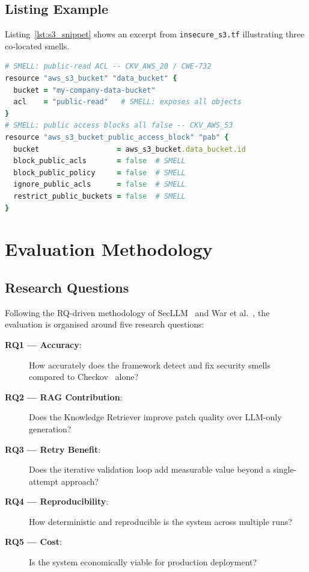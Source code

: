 \documentclass[12pt, a4paper]{report}
\begin{document}
\section{Listing Example}

Listing~\ref{lst:s3_snippet} shows an excerpt from \texttt{insecure\_s3.tf}
illustrating three co-located smells.

\begin{lstlisting}[language=Ruby,
  caption={Excerpt from \texttt{insecure\_s3.tf} showing three co-located security smells.},
  label={lst:s3_snippet}]
# SMELL: public-read ACL -- CKV_AWS_20 / CWE-732
resource "aws_s3_bucket" "data_bucket" {
  bucket = "my-company-data-bucket"
  acl    = "public-read"   # SMELL: exposes all objects
}
# SMELL: public access blocks all false -- CKV_AWS_53
resource "aws_s3_bucket_public_access_block" "pab" {
  bucket                  = aws_s3_bucket.data_bucket.id
  block_public_acls       = false  # SMELL
  block_public_policy     = false  # SMELL
  ignore_public_acls      = false  # SMELL
  restrict_public_buckets = false  # SMELL
}
\end{lstlisting}

\chapter{Evaluation Methodology}
\label{chap:evaluation}

\section{Research Questions}

Following the RQ-driven methodology of SecLLM~\citep{devito2025secllm} and War et
al.~\citep{war2025detection}, the evaluation is organised around five research questions:

\begin{description}
  \item[\textbf{RQ1 --- Accuracy}:] How accurately does the framework detect and fix
  security smells compared to Checkov~\citep{checkov2024} alone?
  \item[\textbf{RQ2 --- RAG Contribution}:] Does the Knowledge Retriever improve patch
  quality over LLM-only generation?
  \item[\textbf{RQ3 --- Retry Benefit}:] Does the iterative validation loop add
  measurable value beyond a single-attempt approach?
  \item[\textbf{RQ4 --- Reproducibility}:] How deterministic and reproducible is the
  system across multiple runs?
  \item[\textbf{RQ5 --- Cost}:] Is the system economically viable for production
  deployment?
\end{description}
\end{document}
